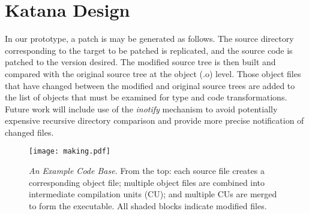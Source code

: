 \section{Katana Design}
\label{sec:design}

In our prototype, a patch is may be generated as follows. The source
directory corresponding to the target to be patched is replicated, and
the source code is patched to the version desired. The modified source
tree is then built and compared with the original source tree at the
object (.o) level. Those object files that have changed between the
modified and original source trees are added to the list of objects
that must be examined for type and code transformations. Future work
will include use of the {\it inotify} mechanism to avoid potentially
expensive recursive directory comparison and provide more precise
notification of changed files.


\begin{figure}[ht]
\begin{center}
\texttt{[image: making.pdf]}
\end{center}
\caption{{\small {\it An Example Code Base.} From the top: each source
    file creates a corresponding object file; multiple object files
    are combined into intermediate compilation units (CU); and
    multiple CUs are merged to form the executable. All shaded blocks
    indicate modified files.}}
\label{fig:making}
\end{figure}

